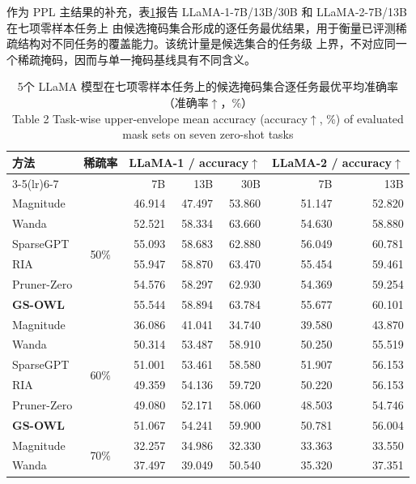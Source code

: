 \documentclass[UTF8,fontset=fandol]{ctexart}
\renewcommand{\arraystretch}{1.08}
\begin{document}
作为 PPL 主结果的补充，表\ref{tab:zero}报告 LLaMA-1-7B/13B/30B 和 LLaMA-2-7B/13B 在七项零样本任务上
由候选掩码集合形成的逐任务最优结果，用于衡量已评测稀疏结构对不同任务的覆盖能力。该统计量是候选集合的任务级
上界，不对应同一个稀疏掩码，因而与单一掩码基线具有不同含义。

\begin{table}[!htbp]
\centering
\caption{5个 LLaMA 模型在七项零样本任务上的候选掩码集合逐任务最优平均准确率（准确率$\uparrow$，\%）\\
Table 2 Task-wise upper-envelope mean accuracy (accuracy$\uparrow$, \%) of evaluated mask sets on seven zero-shot tasks}
\label{tab:zero}
\scriptsize
\setlength{\tabcolsep}{4.2pt}
\renewcommand{\arraystretch}{0.96}
\begin{tabular*}{0.98\textwidth}{@{\extracolsep{\fill}}lcrrrrr@{}}
\toprule
\multirow{2}{*}{方法} & \multirow{2}{*}{稀疏率} &
\multicolumn{3}{c}{LLaMA-1 / accuracy$\uparrow$} & \multicolumn{2}{c}{LLaMA-2 / accuracy$\uparrow$} \\
\cmidrule(lr){3-5}\cmidrule(lr){6-7}
 & & 7B & 13B & 30B & 7B & 13B \\
\midrule
Magnitude & \multirow{6}{*}{50\%} & 46.914 & 47.497 & 53.860 & 51.147 & 52.820 \\
Wanda & & 52.521 & 58.334 & 63.660 & 54.630 & 58.880 \\
SparseGPT & & 55.093 & 58.683 & 62.880 & 56.049 & 60.781 \\
RIA & & 55.947 & 58.870 & 63.470 & 55.454 & 59.461 \\
Pruner-Zero & & 54.576 & 58.297 & 62.930 & 54.369 & 59.254 \\
  \textbf{GS-OWL} & & 55.544 & 58.894 & 63.784 & 55.677 & 60.101 \\
\midrule
Magnitude & \multirow{6}{*}{60\%} & 36.086 & 41.041 & 34.740 & 39.580 & 43.870 \\
Wanda & & 50.314 & 53.487 & 58.910 & 50.250 & 55.519 \\
  SparseGPT & & 51.001 & 53.461 & 58.580 & 51.907 & 56.153 \\
RIA & & 49.359 & 54.136 & 59.720 & 50.220 & 56.153 \\
Pruner-Zero & & 49.080 & 52.171 & 58.060 & 48.503 & 54.746 \\
  \textbf{GS-OWL} & & 51.067 & 54.241 & 59.900 & 50.781 & 56.004 \\
\midrule
Magnitude & \multirow{6}{*}{70\%} & 32.257 & 34.986 & 32.330 & 33.363 & 33.550 \\
Wanda & & 37.497 & 39.049 & 50.540 & 35.320 & 37.351 \\

\end{tabular*}
\end{table}
\end{document}
